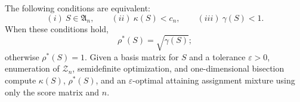 The following conditions are equivalent: \[(i)\ S\in\mathfrak A_n,\qquad (ii)\ \kappa(S)<c_n,\qquad (iii)\ \gamma(S)<1.\] When these conditions hold, \[\rho^*(S)=\sqrt{\gamma(S)};\] otherwise \(\rho^*(S)=1\). Given a basis matrix for \(S\) and a tolerance \(\varepsilon>0\), enumeration of \(\mathcal Z_n\), semidefinite optimization, and one-dimensional bisection compute \(\kappa(S)\), \(\rho^*(S)\), and an \(\varepsilon\)-optimal attaining assignment mixture using only the score matrix and \(n\).